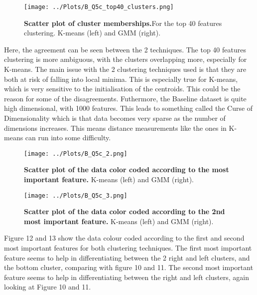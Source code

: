 \documentclass[12pt]{report} %
\begin{document}
\begin{figure}[htbp]
    \centering
    \texttt{[image: ../Plots/B\_Q5c\_top40\_clusters.png]}
    \caption{\textbf{Scatter plot of cluster memberships.}For the top 40 features clustering. K-means (left) and GMM (right).}
\end{figure}

Here, the agreement can be seen between the 2 techniques. The top 40 features clustering is more ambiguous, with the clusters overlapping more, especially for K-means. The main issue with the 2 clustering techniques used is that they are both at risk of falling into local minima. This is especially true for K-means, which is very sensitive to the initialisation of the centroids\cite[p. 263]{sklearn_book}. This could be the reason for some of the disagreements. Futhermore, the Baseline dataset is quite high dimensional, with 1000 features. This leads to something called the Curse of Dimensionality which is that data becomes very sparse as the number of dimensions increases\cite[p. 217]{sklearn_book}. This means distance measurements like the ones in K-means can run into some difficulty.  

\begin{figure}[htbp]
    \centering
    \texttt{[image: ../Plots/B\_Q5c\_2.png]}
    \caption{\textbf{Scatter plot of the data color coded according to the most important feature.} K-means (left) and GMM (right).}
\end{figure}


\begin{figure}[htbp]
    \centering
    \texttt{[image: ../Plots/B\_Q5c\_3.png]}
    \caption{\textbf{Scatter plot of the data color coded according to the 2nd most important feature.} K-means (left) and GMM (right).}
\end{figure}

Figure 12 and 13 show the data colour coded according to the first and second most important features for both clustering techniques. The first most important feature seems to help in differentiating between the 2 right and left clusters, and the bottom cluster, comparing with figure 10 and 11. The second most important feature seems to help in differentiating between the right and left clusters, again looking at Figure 10 and 11.


\end{document}
